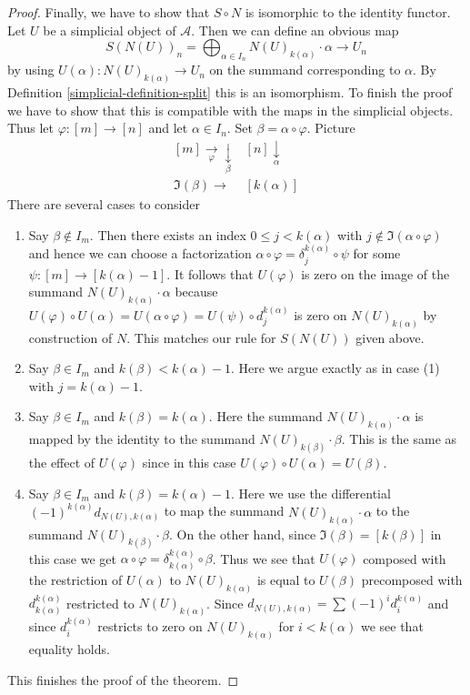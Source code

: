 \begin{proof}
\medskip\noindent
Finally, we have to show that $S \circ N$ is isomorphic to the
identity functor. Let $U$ be a simplicial object of $\mathcal{A}$.
Then we can define an obvious map
$$
S(N(U))_n = \bigoplus\nolimits_{\alpha \in I_n} N(U)_{k(\alpha)} \cdot \alpha
\longrightarrow
U_n
$$
by using $U(\alpha) : N(U)_{k(\alpha)} \to U_n$ on the summand corresponding
to $\alpha$. By Definition \ref{simplicial-definition-split} this is an isomorphism.
To finish the proof we have to show that this is compatible with
the maps in the simplicial objects. Thus let $\varphi : [m] \to [n]$
and let $\alpha \in I_n$. Set $\beta = \alpha \circ \varphi$.
Picture
$$
\begin{array}{cc}[m] \underset{\varphi}{\longrightarrow}\underset{\beta}{\downarrow} & [n] \underset{\alpha}{\downarrow} \\ \Im(\beta) \longrightarrow & [k(\alpha)]\end{array}
$$
There are several cases to consider
\begin{enumerate}
\item Say $\beta \not \in I_m$. Then there exists an index
$0 \leq j < k(\alpha)$ with $j \not \in \Im(\alpha \circ \varphi)$
and hence we can choose a factorization
$\alpha \circ \varphi = \delta^{k(\alpha)}_j \circ \psi$
for some $\psi : [m] \to [k(\alpha) - 1]$.
It follows that $U(\varphi)$ is zero on the image of the summand
$N(U)_{k(\alpha)} \cdot \alpha$ because $U(\varphi) \circ U(\alpha) =
U(\alpha \circ \varphi) = U(\psi) \circ d^{k(\alpha)}_j$
is zero on $N(U)_{k(\alpha)}$ by construction of $N$.
This matches our rule for $S(N(U))$ given above.
\item Say $\beta \in I_m$ and $k(\beta) < k(\alpha) - 1$. Here we
argue exactly as in case (1) with $j = k(\alpha) - 1$.
\item Say $\beta \in I_m$ and $k(\beta) = k(\alpha)$. Here
the summand $N(U)_{k(\alpha)} \cdot \alpha$ is mapped by the
identity to the summand $N(U)_{k(\beta)} \cdot \beta$.
This is the same as the effect of $U(\varphi)$ since in
this case $U(\varphi) \circ U(\alpha) = U(\beta)$.
\item Say $\beta \in I_m$ and $k(\beta) = k(\alpha) - 1$.
Here we use the differential $(-1)^{k(\alpha)} d_{N(U), k(\alpha)}$
to map the summand $N(U)_{k(\alpha)} \cdot \alpha$
to the summand $N(U)_{k(\beta)} \cdot \beta$.
On the other hand, since $\Im(\beta) = [k(\beta)]$ in this case
we get $\alpha \circ \varphi = \delta^{k(\alpha)}_{k(\alpha)} \circ \beta$.
Thus we see that $U(\varphi)$ composed with the restriction of
$U(\alpha)$ to $N(U)_{k(\alpha)}$ is equal to
$U(\beta)$ precomposed with $d^{k(\alpha)}_{k(\alpha)}$ restricted to
$N(U)_{k(\alpha)}$.
Since $d_{N(U), k(\alpha)} = \sum (-1)^i d^{k(\alpha)}_i$
and since $d^{k(\alpha)}_i$ restricts to zero on
$N(U)_{k(\alpha)}$ for $i < k(\alpha)$
we see that equality holds.
\end{enumerate}
This finishes the proof of the theorem.
\end{proof}

